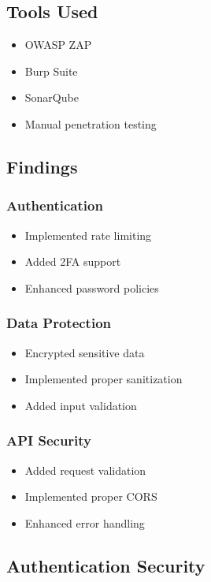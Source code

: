 \subsection{Tools Used}
\begin{itemize}
    \item OWASP ZAP
    \item Burp Suite
    \item SonarQube
    \item Manual penetration testing
\end{itemize}

\subsection{Findings}

\subsubsection{Authentication}
\begin{itemize}
    \item Implemented rate limiting
    \item Added 2FA support
    \item Enhanced password policies
\end{itemize}

\subsubsection{Data Protection}
\begin{itemize}
    \item Encrypted sensitive data
    \item Implemented proper sanitization
    \item Added input validation
\end{itemize}

\subsubsection{API Security}
\begin{itemize}
    \item Added request validation
    \item Implemented proper CORS
    \item Enhanced error handling
\end{itemize}

\subsection{Authentication Security}

